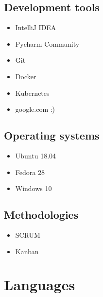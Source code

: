\documentclass[12pt,a4paper,sans]{moderncv}        %
\begin{document}


\subsection{Development tools}
\begin{multicols}{2}
\begin{itemize}
\item IntelliJ IDEA
\item Pycharm Community
\item Git 
\item Docker
\item Kubernetes
\item google.com :)
\end{itemize}
\end{multicols}


\subsection{Operating systems}
\begin{multicols}{2}
\begin{itemize}
\item Ubuntu 18.04 
\item Fedora 28
\item Windows 10
\end{itemize}
\end{multicols}

\subsection{Methodologies}
\begin{multicols}{2}
\begin{itemize}
\item SCRUM
\item Kanban 
\end{itemize}
\end{multicols}



\section{Languages}
\end{document}
